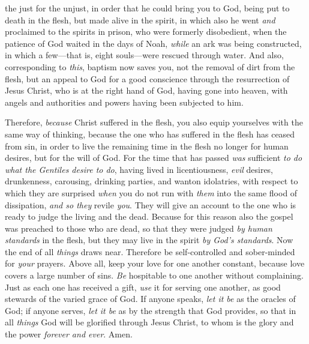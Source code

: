 \begin{biblechapter}
the just for the unjust, 
in order that he could bring you to God, 
being put to death in the flesh, 
but made alive in the spirit,
\verse in which also he went \textit{and} proclaimed to the spirits in prison,
\verse who were formerly disobedient, when the patience of God waited in the days of Noah, \textit{while} an ark was being constructed, in which a few—that is, eight souls—were rescued through water.
\verse And also, corresponding to \textit{this}, baptism now saves you, not the removal of dirt from the flesh, but an appeal to God for a good conscience through the resurrection of Jesus Christ,
\verse who is at the right hand of God, having gone into heaven, with angels and authorities and powers having been subjected to him.
\end{biblechapter}

\begin{biblechapter} %
 Therefore, \textit{because} Christ suffered in the flesh, you also equip yourselves with the same way of thinking, because the one who has suffered in the flesh has ceased from sin,
\verse in order to live the remaining time in the flesh no longer for human desires, but for the will of God.
\verse For the time that has passed \textit{was} sufficient \textit{to do what the Gentiles desire to do}, having lived in licentiousness, \textit{evil} desires, drunkenness, carousing, drinking parties, and wanton idolatries,
\verse with respect to which they are surprised \textit{when} you do not run with \textit{them} into the same flood of dissipation, \textit{and so they} revile \textit{you}.
\verse They will give an account to the one who is ready to judge the living and the dead.
\verse Because for this reason also the gospel was preached to those who are dead, so that they were judged \textit{by human standards} in the flesh, but they may live in the spirit \textit{by God’s standards}.
 Now the end of all \textit{things} draws near. Therefore be self-controlled and sober-minded for \textit{your} prayers.
\verse Above all, keep your love for one another constant, because love covers a large number of sins.
\verse \textit{Be} hospitable to one another without complaining.
\verse Just as each one has received a gift, \textit{use} it for serving one another, as good stewards of the varied grace of God.
\verse If anyone speaks, \textit{let it be} as the oracles of God; if anyone serves, \textit{let it be} as by the strength that God provides, so that in all \textit{things} God will be glorified through Jesus Christ, to whom is the glory and the power \textit{forever and ever}. Amen.

\end{biblechapter}
